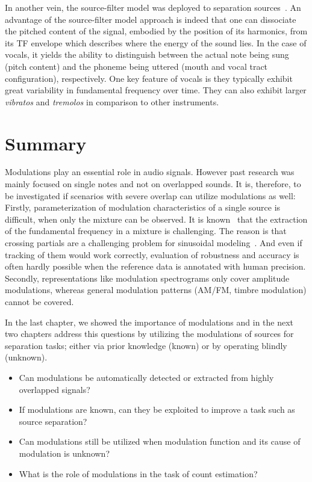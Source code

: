 In another vein, the source-filter model was deployed to separation sources~\cite{hennequin10}.
An advantage of the source-filter model approach is indeed that one can dissociate the pitched content of the signal, embodied by the position of its harmonics, from its TF envelope which describes where the energy of the sound lies. In the case of vocals, it yields the ability to distinguish between the actual note being sung (pitch content) and the phoneme being uttered (mouth and vocal tract configuration), respectively. 
One key feature of vocals is they typically exhibit great variability in fundamental frequency over time. 
They can also exhibit larger \textit{vibratos} and \textit{tremolos} in comparison to other instruments.

\section{Summary}

Modulations play an essential role in audio signals. 
However past research was mainly focused on single notes and not on overlapped sounds.
It is, therefore, to be investigated if scenarios with severe overlap can utilize modulations as well: Firstly, parameterization of modulation characteristics of a single source is difficult, when only the mixture can be observed. 
It is known~\cite{salamon13} that the extraction of the fundamental frequency in a mixture is challenging. 
The reason is that crossing partials are a challenging problem for sinusoidal modeling~\cite{viste03}. 
And even if tracking of them would work correctly, evaluation of robustness and accuracy is often hardly possible when the reference data is annotated with human precision.
Secondly, representations like modulation spectrograms only cover amplitude modulations, whereas general modulation patterns (AM/FM, timbre modulation) cannot be covered.
\par
In the last chapter, we showed the importance of modulations and in the next two chapters address this questions by utilizing the modulations of sources for separation tasks; either via prior knowledge (known) or by operating blindly (unknown).

\begin{itemize}
  \item Can modulations be automatically detected or extracted from highly overlapped signals?
  \item If modulations are known, can they be exploited to improve a task such as source separation?
  \item Can modulations still be utilized when modulation function and its cause of modulation is unknown?
  \item What is the role of modulations in the task of count estimation?
\end{itemize}


